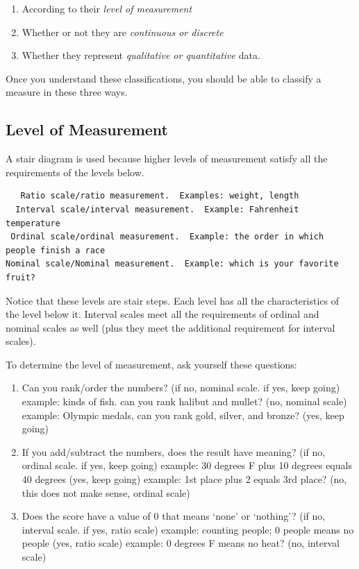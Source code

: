 \documentclass[
]{book}
\providecommand{\tightlist}{%
  \setlength{\itemsep}{0pt}\setlength{\parskip}{0pt}}
\begin{document}
\begin{enumerate}
\def\labelenumi{\arabic{enumi}.}
\tightlist
\item
  According to their \emph{level of measurement}
\item
  Whether or not they are \emph{continuous or discrete}
\item
  Whether they represent \emph{qualitative or quantitative} data.
\end{enumerate}

Once you understand these classifications, you should be able to classify a measure in these three ways.

\hypertarget{level-of-measurement}{%
\subsection{Level of Measurement}\label{level-of-measurement}}

A stair diagram is used because higher levels of measurement satisfy all the requirements of the levels below.

\begin{verbatim}
   Ratio scale/ratio measurement.  Examples: weight, length         
  Interval scale/interval measurement.  Example: Fahrenheit temperature     
 Ordinal scale/ordinal measurement.  Example: the order in which people finish a race 
Nominal scale/Nominal measurement.  Example: which is your favorite fruit?
\end{verbatim}

Notice that these levels are stair steps. Each level has all the characteristics of the level below it. Interval scales meet all the requirements of ordinal and nominal scales as well (plus they meet the additional requirement for interval scales).

To determine the level of measurement, ask yourself these questions:

\begin{enumerate}
\def\labelenumi{\arabic{enumi}.}
\tightlist
\item
  Can you rank/order the numbers? (if no, nominal scale. if yes, keep going) example: kinds of fish. can you rank halibut and mullet? (no, nominal scale) example: Olympic medals, can you rank gold, silver, and bronze? (yes, keep going)
\item
  If you add/subtract the numbers, does the result have meaning? (if no, ordinal scale. if yes, keep going) example: 30 degrees F plus 10 degrees equals 40 degrees (yes, keep going) example: 1st place plus 2 equals 3rd place? (no, this does not make sense, ordinal scale)
\item
  Does the score have a value of 0 that means `none' or `nothing'? (if no, interval scale. if yes, ratio scale) example: counting people; 0 people means no people (yes, ratio scale) example: 0 degrees F means no heat? (no, interval scale)
\end{enumerate}
\end{document}
